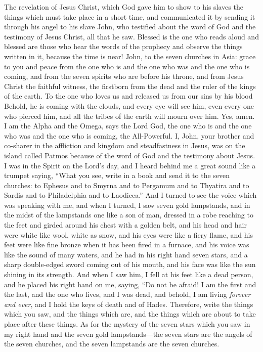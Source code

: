 
\begin{biblechapter} %
 The revelation of Jesus Christ, which God gave him to show to his slaves the things which must take place in a short time, and communicated it by sending it through his angel to his slave John,
\verse who testified about the word of God and the testimony of Jesus Christ, all that he saw.
\verse Blessed is the one who reads aloud and blessed are those who hear the words of the prophecy and observe the things written in it, because the time is near!
 John, to the seven churches in Asia: grace to you and peace from the one who is and the one who was and the one who is coming, and from the seven spirits who are before his throne,
\verse and from Jesus Christ the faithful witness, the firstborn from the dead and the ruler of the kings of the earth.
\verse To the one who loves us and released us from our sins by his blood
\verse Behold, he is coming with the clouds, 
and every eye will see him, 
even every one who pierced him, 
and all the tribes of the earth will mourn over him. Yes, amen.
\verse I am the Alpha and the Omega, says the Lord God, the one who is and the one who was and the one who is coming, the All-Powerful.
 I, John, your brother and co-sharer in the affliction and kingdom and steadfastness in Jesus, was on the island called Patmos because of the word of God and the testimony about Jesus.
\verse I was in the Spirit on the Lord’s day, and I heard behind me a great sound like a trumpet
\verse saying, “What you see, write in a book and send it to the seven churches: to Ephesus and to Smyrna and to Pergamum and to Thyatira and to Sardis and to Philadelphia and to Laodicea.”
\verse And I turned to see the voice which was speaking with me, and when I turned, I saw seven gold lampstands,
\verse and in the midst of the lampstands one like a son of man, dressed in a robe reaching to the feet and girded around his chest with a golden belt,
\verse and his head and hair were white like wool, white as snow, and his eyes were like a fiery flame,
\verse and his feet were like fine bronze when it has been fired in a furnace, and his voice was like the sound of many waters,
\verse and he had in his right hand seven stars, and a sharp double-edged sword coming out of his mouth, and his face was like the sun shining in its strength.
\verse And when I saw him, I fell at his feet like a dead person, and he placed his right hand on me, saying, “Do not be afraid! I am the first and the last,
\verse and the one who lives, and I was dead, and behold, I am living \textit{forever and ever}, and I hold the keys of death and of Hades.
\verse Therefore, write the things which you saw, and the things which are, and the things which are about to take place after these things.
\verse As for the mystery of the seven stars which you saw in my right hand and the seven gold lampstands—the seven stars are the angels of the seven churches, and the seven lampstands are the seven churches.
\end{biblechapter}

